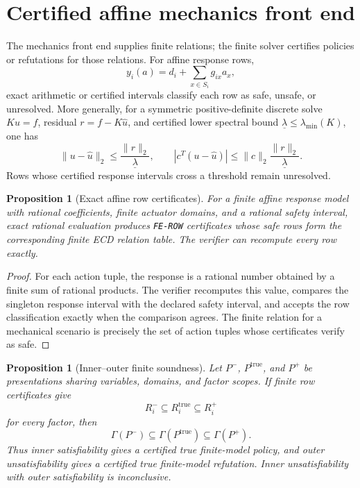 \documentclass[11pt]{article}
\theoremstyle{plain}
\newtheorem{proposition}[theorem]{Proposition}
\theoremstyle{definition}
\theoremstyle{remark}
\begin{document}
\section{Certified affine mechanics front end}
\label{sec:mechanics-front-end}

The mechanics front end supplies finite relations; the finite solver certifies
policies or refutations for those relations.  For affine response rows,
\[
  y_i(a)=d_i+\sum_{x\in S_i}g_{ix}a_x,
\]
exact arithmetic or certified intervals classify each row as safe, unsafe, or
unresolved.  More generally, for a symmetric positive-definite discrete solve
\(Ku=f\), residual \(r=f-K\widehat u\), and certified lower spectral bound
\(\underline\lambda\le\lambda_{
\min}(K)\), one has
\[
  \|u-\widehat u\|_2\le \frac{\|r\|_2}{\underline\lambda},
  \qquad
  |c^T(u-\widehat u)|\le
  \|c\|_2\frac{\|r\|_2}{\underline\lambda}.
\]
Rows whose certified response intervals cross a threshold remain unresolved.

\begin{proposition}[Exact affine row certificates]
\label{prop:exact-affine-row-certificates}
For a finite affine response model with rational coefficients, finite actuator
domains, and a rational safety interval, exact rational evaluation produces
\texttt{FE-ROW} certificates whose safe rows form the corresponding finite ECD
relation table.  The verifier can recompute every row exactly.
\end{proposition}

\begin{proof}
For each action tuple, the response is a rational number obtained by a finite
sum of rational products.  The verifier recomputes this value, compares the
singleton response interval with the declared safety interval, and accepts the
row classification exactly when the comparison agrees.  The finite relation for
a mechanical scenario is precisely the set of action tuples whose certificates
verify as safe.
\end{proof}

\begin{proposition}[Inner--outer finite soundness]
\label{prop:inner-outer-soundness}
Let \(P^-\), \(P^{\mathrm{true}}\), and \(P^+\) be presentations sharing
variables, domains, and factor scopes.  If finite row certificates give
\[
  R_i^-\subseteq R_i^{\mathrm{true}}\subseteq R_i^+
\]
for every factor, then
\[
  \Gamma(P^-)\subseteq\Gamma(P^{\mathrm{true}})\subseteq\Gamma(P^+).
\]
Thus inner satisfiability gives a certified true finite-model policy, and outer
unsatisfiability gives a certified true finite-model refutation.  Inner
unsatisfiability with outer satisfiability is inconclusive.
\end{proposition}
\end{document}
